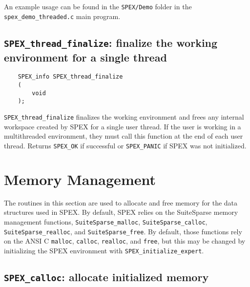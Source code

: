 \documentclass[12pt]{report}
\theoremstyle{definition}
\begin{document}
An example usage can be found in the \verb'SPEX/Demo' folder in the
\verb'spex_demo_threaded.c' main program.

\subsection{\texttt{SPEX\_thread\_finalize}: finalize the working environment for a single thread}

\begin{mdframed}[userdefinedwidth=6in]
{\footnotesize
\begin{verbatim}
    SPEX_info SPEX_thread_finalize
    ( 
        void 
    );
\end{verbatim}
} \end{mdframed}

\verb|SPEX_thread_finalize| finalizes the working environment and frees any 
internal workspace created by SPEX for a single user thread. If the user is working
in a multithreaded environment, they must call this function at the end of each
user thread. Returns \verb|SPEX_OK| if successful or \verb|SPEX_PANIC| if SPEX was not 
initialized.


\section{Memory Management} \label{s:user:memmanag}

The routines in this section are used to allocate and free memory for the data
structures used in SPEX.  By default, SPEX relies on the SuiteSparse
memory management functions, \verb|SuiteSparse_malloc|,
\verb|SuiteSparse_calloc|, \verb|SuiteSparse_realloc|, and
\verb|SuiteSparse_free|.  By default, those functions rely on the ANSI C
\verb|malloc|, \verb|calloc|, \verb|realloc|, and \verb|free|, but this may be
changed by initializing the SPEX environment with
\verb|SPEX_initialize_expert|.

\subsection{\texttt{SPEX\_calloc}: allocate initialized memory}
\label{ss:SPEX_calloc}
\end{document}
